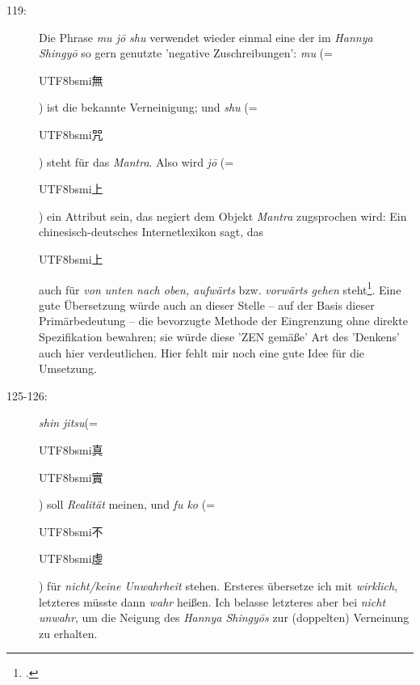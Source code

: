 \documentclass[
DIV=calc,
BCOR=5mm,
11pt,
headings=small,
oneside,
bibtotocnumbered]{scrartcl}
\newcommand{\cnbsmi}[1]{\begin{CJK}{UTF8}{bsmi}#1\end{CJK}}
\begin{document}
\begin{description}
  \item[119:] Die Phrase \emph{mu jō shu} verwendet wieder einmal eine der im
  \emph{Hannya Shingyō} so gern genutzte 'negative Zuschreibungen':
  \emph{mu} (= \cnbsmi{無}) ist die bekannte Verneinigung; und \emph{shu} (=
  \cnbsmi{咒}) steht für das \emph{Mantra}. Also wird \emph{jō} (= \cnbsmi{上})
  ein Attribut sein, das negiert dem Objekt \emph{Mantra} zugsprochen wird:
  Ein chinesisch-deutsches Internetlexikon sagt, das \cnbsmi{上} auch für
  \emph{von unten nach oben, aufwärts} bzw. \emph{vorwärts gehen}
  steht\footcite[vgl.][\nopage]{babla2016a}. Eine gute Übersetzung würde auch an
  dieser Stelle -- auf der Basis dieser Primärbedeutung -- die bevorzugte
  Methode der Eingrenzung ohne direkte Spezifikation bewahren; sie würde diese
  'ZEN gemäße' Art des 'Denkens' auch hier verdeutlichen. Hier fehlt mir noch
  eine gute Idee für die Umsetzung.

  \item[125-126:] \emph{shin jitsu}(= \cnbsmi{真} \cnbsmi{實}) soll
  \emph{Realität} meinen, und \emph{fu ko} (= \cnbsmi{不} \cnbsmi{虛} ) für
  \emph{nicht/keine Unwahrheit} stehen. Ersteres übersetze ich mit
  \emph{wirklich}, letzteres müsste dann \emph{wahr} heißen. Ich belasse
  letzteres aber bei \emph{nicht unwahr}, um die Neigung des \emph{Hannya
  Shingyōs} zur (doppelten) Verneinung zu erhalten.
\end{description}


\end{document}
